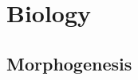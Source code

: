 \section{Biology}

\subsection{Morphogenesis}





\begin{comment}

-Evolution
-Ecology (Predator-prey model)

\end{comment}